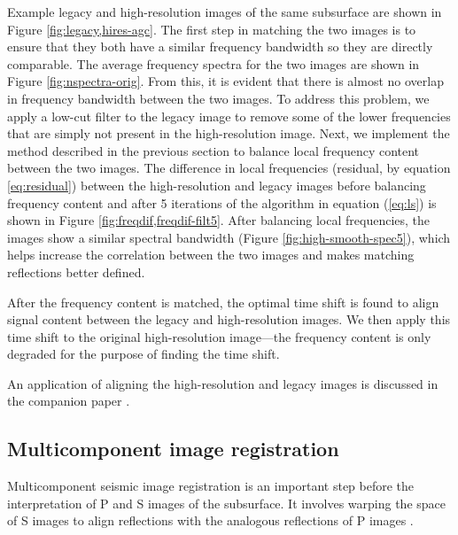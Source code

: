         Example legacy and high-resolution images of the same subsurface are shown in Figure
        \ref{fig:legacy,hires-agc}. The first step in matching the two images is to ensure that they
        both have a similar frequency bandwidth so they are directly comparable. The average frequency
        spectra for the two images are shown in Figure \ref{fig:nspectra-orig}. From this, it is
        evident that there is almost no overlap in frequency bandwidth between the two images.
        To address this problem, we apply a low-cut filter to the legacy image to remove some of the
        lower frequencies that are simply not present in the high-resolution image. Next, we
        implement the method described in the previous section to balance local frequency content
        between the two images. The difference in local frequencies (residual, by equation
        \ref{eq:residual}) between the high-resolution and legacy images before balancing frequency
        content and after 5 iterations of the algorithm in equation (\ref{eq:ls}) is shown in Figure
        \ref{fig:freqdif,freqdif-filt5}. After balancing local frequencies, the images show a
        similar spectral bandwidth (Figure \ref{fig:high-smooth-spec5}), which helps increase the
        correlation between the two images and makes matching reflections better defined.
        
        After the frequency content is matched, the optimal time shift is found to align signal
        content between the legacy and high-resolution images. We then apply this time shift to
        the original high-resolution image---the frequency content is only degraded for the purpose
        of finding the time shift. 
        
        An application of aligning the high-resolution and legacy images is discussed in the companion
        paper \cite[]{merge}.


\subsection{Multicomponent image registration}
        Multicomponent seismic image registration is an important step before the interpretation of
        P and S images of the subsurface. It involves warping the space of S images to align
        reflections with the analogous reflections of P images \cite[]{fomel2003,warp}.

